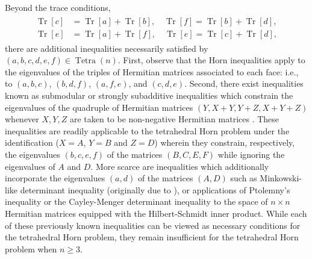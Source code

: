 \documentclass[notitlepage, 11pt, letterpaper]{amsart}
\theoremstyle{plain}
\theoremstyle{definition}
\DeclareMathOperator{\Tr}{Tr}
\DeclareMathOperator{\Tetra}{Tetra}
\newcommand{\ea}{a}
\newcommand{\eb}{b}
\newcommand{\ec}{c}
\newcommand{\ed}{d}
\newcommand{\ee}{e}
\newcommand{\ef}{f}
\begin{document}
Beyond the trace conditions,
\begin{align}
    \label{eq:tet_trace_cond}
    \begin{split}
        \Tr[c] &= \Tr[a] + \Tr[b], \quad
        \Tr[f] = \Tr[b] + \Tr[d], \\
        \Tr[e] &= \Tr[a] + \Tr[f], \quad
        \Tr[e] = \Tr[c] + \Tr[d],
    \end{split}
\end{align}
there are additional inequalities necessarily satisfied by $(\ea,\eb,\ec,\ed,\ee,\ef) \in \Tetra(n)$.
First, observe that the Horn inequalities \cite{horn1962eigenvalues} apply to the eigenvalues of the triples of Hermitian matrices associated to each face: i.e., to $(\ea,\eb,\ec)$, $(\eb,\ed,\ef)$, $(\ea,\ef,\ee)$, and $(\ec,\ed,\ee)$.
Second, there exist inequalities known as submodular or strongly subadditive inequalities which constrain the eigenvalues of the quadruple of Hermitian matrices $(Y,X+Y,Y+Z,X+Y+Z)$ whenever $X,Y,Z$ are taken to be non-negative Hermitian matrices \cite{berndt2015hlawka, tie2011rearrangement, sagnol2013approximation, bouhtou2008optimization, friedland2013submodular, lewin2014family, sra2017determinantoverflow}.
These inequalities are readily applicable to the tetrahedral Horn problem under the identification ($X=A$, $Y=B$ and $Z=D$) wherein they constrain, respectively, the eigenvalues $(\eb,\ec,\ee,\ef)$ of the matrices $(B,C,E,F)$ while ignoring the eigenvalues of $A$ and $D$.
More scarce are inequalities which additionally incorporate the eigenvalues $(\ea,\ed)$ of the matrices $(A,D)$ such as Minkowski-like determinant inequality \cite[Section 6.2]{niculescu2023functions} (originally due to \citeauthor{courtade2016strengthening} \cite{courtade2016strengthening, sra2016reverseoverflow}), or applications of Ptolemny's inequality \cite{schoenberg1952remark} or the Cayley-Menger determinant inequality \cite[Equation 5.2]{sitharam2018handbook} to the space of $n\times n$ Hermitian matrices equipped with the Hilbert-Schmidt inner product.
While each of these previously known inequalities can be viewed as necessary conditions for the tetrahedral Horn problem, they remain insufficient for the tetrahedral Horn problem when $n\geq 3$.
\end{document}
